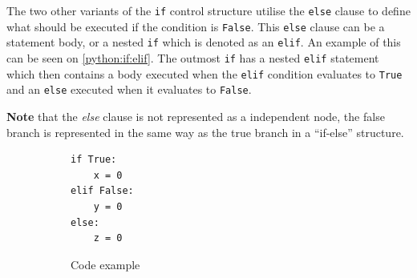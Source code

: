 The two other variants of the \texttt{if} control structure utilise the \texttt{else} clause to define what should be executed if the condition is \texttt{False}.
This \texttt{else} clause can be a statement body, or a nested \texttt{if} which is denoted as an \texttt{elif}.
An example of this can be seen on \cref{python:if:elif}.
The outmost \texttt{if} has a nested \texttt{elif} statement which then contains a body executed when the \texttt{elif} condition evaluates to \texttt{True} and an \texttt{else} executed when it evaluates to \texttt{False}.

\textbf{Note} that the \textit{else} clause is not represented as a independent node, the false branch is represented in the same way as the true branch in a ``if-else'' structure.

\begin{figure}[H]
  \centering
  \begin{subfigure}[b]{0.4\textwidth}
    \begin{lstlisting}[style=python]
if True:
    x = 0
elif False:
    y = 0
else:
    z = 0
    \end{lstlisting}
    \caption{Code example}
    \label{python:if:elif:code}
  \end{subfigure}
  ~ %
  \begin{subfigure}[b]{0.4\textwidth}
    \centering

\end{subfigure}
\end{figure}
